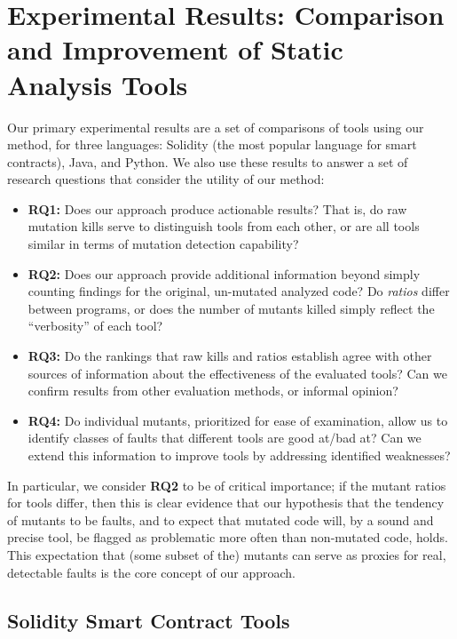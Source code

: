 \section{Experimental Results: Comparison and Improvement of Static Analysis Tools}

Our primary experimental results are a set of comparisons of tools using our method, for three languages: Solidity (the most popular language for smart contracts), Java, and Python.  We also use these results to answer a set of research questions that consider the utility of our method:

\begin{itemize}
\item {\bf RQ1:}  Does our approach produce actionable results?  That is, do raw mutation kills serve to distinguish tools from each other, or are all tools similar in terms of mutation detection capability?
\item {\bf RQ2:}  Does our approach provide additional information beyond simply counting findings for the original, un-mutated analyzed code?  Do \emph{ratios} differ between programs, or does the number of mutants killed simply reflect the ``verbosity'' of each tool?
\item {\bf RQ3:}  Do the rankings that raw kills and ratios establish agree with other sources of information about the effectiveness of the evaluated tools?  Can we confirm results from other evaluation methods, or informal opinion?
\item {\bf RQ4:}  Do individual mutants, prioritized for ease of examination, allow us to identify classes of faults that different tools are good at/bad at?  Can we extend this information to improve tools by addressing identified weaknesses?
  \end{itemize}

In particular, we consider {\bf RQ2} to be of critical importance; if the mutant ratios for tools differ, then this is clear evidence that our hypothesis that the tendency of mutants to be faults, and to expect that mutated code will, by a sound and precise tool, be flagged as problematic more often than non-mutated code, holds.  This expectation that (some subset of the) mutants can serve as proxies for real, detectable faults is the core concept of our approach.
  
\subsection{Solidity Smart Contract Tools}

